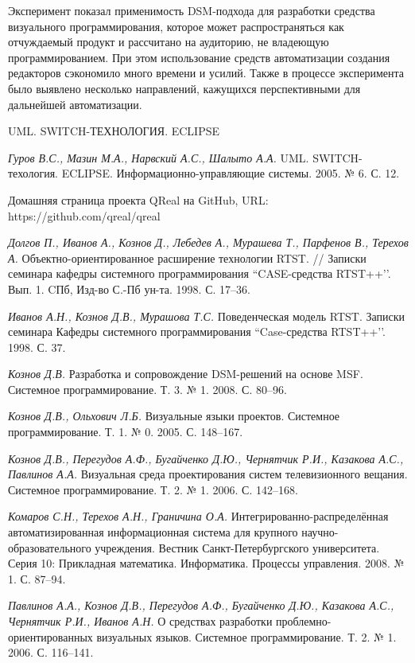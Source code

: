 \documentclass[a4paper]{article}
\begin{document}
{Эксперимент показал применимость DSM-подхода для разработки средства визуального программирования, которое может распространяться как отчуждаемый продукт и рассчитано на аудиторию, не владеющую программированием. При этом использование средств автоматизации создания редакторов сэкономило много времени и усилий. Также в процессе эксперимента было выявлено несколько направлений, кажущихся перспективными для дальнейшей автоматизации.

\begin{thebibliography}{9001}

UML. SWITCH-ТЕХНОЛОГИЯ. ECLIPSE

 \emph{Гуров В.С., Мазин М.А., Нарвский А.С., Шалыто А.А.} UML. SWITCH-техология. ECLIPSE. Информационно-управляющие системы. 2005. № 6. С. 12.

   Домашняя страница проекта QReal на GitHub, URL: https://github.com/qreal/qreal 

   \emph{Долгов П., Иванов А., Кознов Д., Лебедев А., Мурашева Т., Парфенов В., Терехов А.} Объектно-ориентированное расширение технологии RTST. // Записки семинара кафедры системного программирования ``CASE-средства RTST++’’. Вып. 1. CПб, Изд-во С.-Пб ун-та. 1998. С. 17--36.

   \emph{Иванов А.Н., Кознов Д.В., Мурашова Т.С.} Поведенческая модель RTST. Записки семинара Кафедры системного программирования ``Case-средства RTST++’’. 1998. С. 37.


   \emph{Кознов Д.В.} Разработка и сопровождение DSM-решений на основе MSF. Системное программирование. Т. 3. № 1. 2008. С. 80--96.

   \emph{Кознов Д.В., Ольхович Л.Б.} Визуальные языки проектов. Системное программирование. Т. 1. № 0. 2005. С. 148--167.

   \emph{Кознов Д.В., Перегудов А.Ф., Бугайченко Д.Ю., Чернятчик Р.И., Казакова А.С., Павлинов А.А.} Визуальная среда проектирования систем телевизионного вещания. Системное программирование. Т. 2. № 1. 2006. С. 142--168.

   \emph{Комаров С.Н., Терехов А.Н., Граничина О.А.} Интегрированно-распределённая автоматизированная информационная система для крупного научно-образовательного учреждения. Вестник Санкт-Петербургского университета. Серия 10: Прикладная математика. Информатика. Процессы управления. 2008. № 1. С. 87--94. 

   \emph{Павлинов А.А., Кознов Д.В., Перегудов А.Ф., Бугайченко Д.Ю., Казакова А.С., Чернятчик Р.И., Иванов А.Н.} О средствах разработки проблемно-ориентированных визуальных языков. Системное программирование. Т. 2. № 1. 2006. С. 116--141.


\end{thebibliography}}
\end{document}
